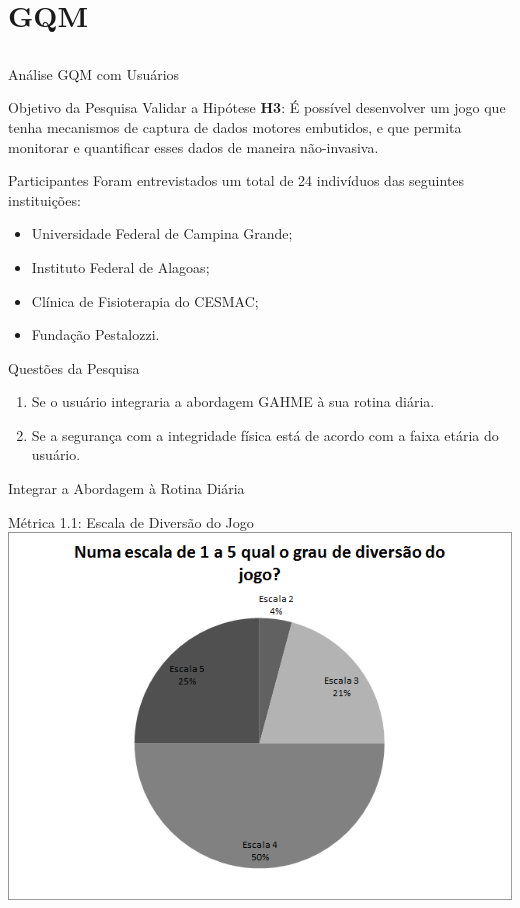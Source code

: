 \documentclass{beamer}
\begin{document}
\section{GQM}
\subsection{}
\begin{frame}{Análise GQM com Usuários} 
    \begin{block}{Objetivo da Pesquisa}
      Validar a Hipótese \textbf{H3}: É possível desenvolver um jogo que tenha mecanismos de captura de dados motores embutidos, e que permita monitorar e quantificar esses dados de maneira não-invasiva.
    \end{block}
		\begin{block}{Participantes}
		Foram entrevistados um total de 24 indivíduos das seguintes instituições:
			\begin{itemize}
				\item Universidade Federal de Campina Grande;
				\item Instituto Federal de Alagoas;
				\item Clínica de Fisioterapia do CESMAC;
				\item Fundação Pestalozzi.
			\end{itemize}
    \end{block}
\end{frame} 

\begin{frame}{Questões da Pesquisa} 
    \begin{block}{}
			\begin{enumerate}
				\item Se o usuário integraria a abordagem GAHME à sua rotina diária.
				\item Se a segurança com a integridade física está de acordo com a faixa etária do usuário.
			\end{enumerate}
    \end{block}
\end{frame}

\begin{frame}{Integrar a Abordagem à Rotina Diária} 
    \begin{block}{Métrica 1.1: Escala de Diversão do Jogo}
			\center \includegraphics[height=2.6 in]{img/chart_1-.png}
    \end{block}
\end{frame}
\end{document}
